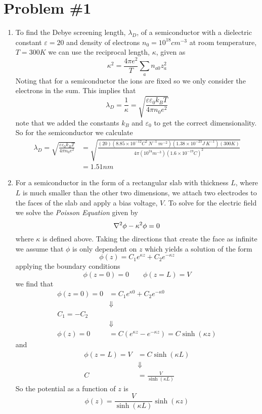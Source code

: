 \documentclass[11pt]{article}
\numberwithin{equation}{section}
\begin{document}


\section{Problem \#1}
\begin{enumerate}[(1)]
\item To find the Debye screening length, $\lambda_D$, of a semiconductor with a dielectric constant
$\varepsilon=20$ and density of electrons $n_0=10^{18}\unit{cm^{-3}}$ at room temperature, 
$T=300\unit{K}$ we can use the reciprocal length, $\kappa$, given as
$$\kappa^2 = \frac{4\pi{e^2}}{T}\sum_{a}n_{a0}z_a^2$$
Noting that for a semiconductor the ions are fixed so we only consider the electrons in the 
sum. This implies that
$$\lambda_D = \frac{1}{\kappa} = \sqrt{\frac{\varepsilon\varepsilon_0k_BT}{4\pi n_0e^2}}$$
note that we added the constants $k_B$ and $\varepsilon_0$ to get the correct dimensionality.
So for the semiconductor we calculate
\begin{align*}
\lambda_D = \sqrt{\frac{\varepsilon\varepsilon_0k_BT}{4\pi n_0e^2}} &= \sqrt{\frac{(20)(8.85\times10^{-12}\unit{C^2\ N^{-1}\ m^{-2}})(1.38\times10^{-23}\unit{J\ K^{-1}})(300\unit{K})}{4\pi(10^{24}\unit{m^{-3}})(1.6\times10^{-19}\unit{C})^2}}\\
&= 1.51\unit{nm}
\end{align*}

\item For a semiconductor in the form of a rectangular slab with thickness $L$, where $L$ is 
much smaller than the other two dimensions, we attach two electrodes to the faces of the slab
and apply a bias voltage, $V$. To solve for the electric field we solve the \emph{Poisson 
Equation} given by
\begin{equation}
\bold\nabla^2\phi-\kappa^2\phi = 0
\end{equation}
where $\kappa$ is defined above. Taking the directions that create the face as infinite we 
assume that $\phi$ is only dependent on $z$ which yields a solution of the form
$$\phi(z) = C_1e^{\kappa{z}} + C_2e^{-\kappa{z}}$$
applying the boundary conditions 
$$\phi(z=0)=0\qquad\phi(z=L)=V$$
we find that 
\begin{align*}
\phi(z=0) = 0 &= C_1e^{\kappa{0}} + C_2e^{-\kappa{0}}\\
&\Downarrow\\
C_1 = -C_2\\
&\Downarrow\\
\phi(z) = 0 &= C\left(e^{\kappa{z}} - e^{-\kappa{z}}\right) = C\sinh(\kappa{z})
\end{align*}
and
\begin{align*}
\phi(z=L) = V &=  C\sinh(\kappa{L})\\
&\Downarrow\\
C &= \frac{V}{\sinh(\kappa{L})}
\end{align*}
So the potential as a function of $z$ is
$$\phi(z) = \frac{V}{\sinh(\kappa{L})}\sinh(\kappa{z})$$


\end{enumerate}
\end{document}

